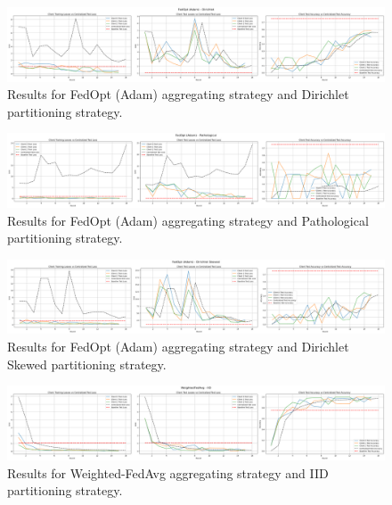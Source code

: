 \documentclass[11pt]{article}
\begin{document}
    \begin{figure}[h!]
        \centering
        \includegraphics[width=1\linewidth]{img/experiment_2/fedopt-dirichlet}
        \caption{Results for FedOpt (Adam) aggregating strategy and Dirichlet partitioning strategy.}
        \label{fig:exp2-fedopt-dirichlet}
    \end{figure}

    \begin{figure}[h!]
        \centering
        \includegraphics[width=1\linewidth]{img/experiment_2/fedopt-pathological}
        \caption{Results for FedOpt (Adam) aggregating strategy and Pathological partitioning strategy.}
        \label{fig:exp2-fedopt-pathological}
    \end{figure}

    \begin{figure}[h!]
        \centering
        \includegraphics[width=1\linewidth]{img/experiment_2/fedopt-dirichlet-skewed}
        \caption{Results for FedOpt (Adam) aggregating strategy and Dirichlet Skewed partitioning strategy.}
        \label{fig:exp2-fedopt-dirichlet-skewed}
    \end{figure}

    \begin{figure}[h!]
        \centering
        \includegraphics[width=1\linewidth]{img/experiment_2/weightedfedavg-iid}
        \caption{Results for Weighted-FedAvg aggregating strategy and IID partitioning strategy.}
        \label{fig:exp2-weightedfedavg-iid}
    \end{figure}
\end{document}
